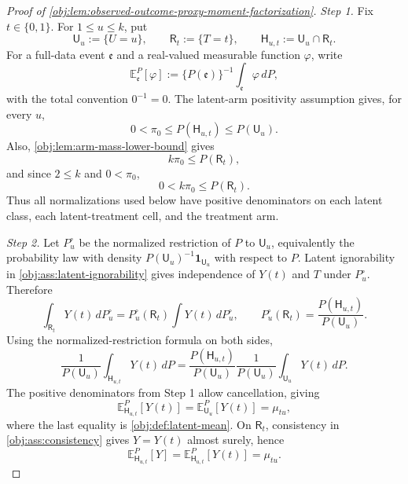 \documentclass[11pt]{article}
\begin{document}
\begin{proof}[Proof of \cref{obj:lem:observed-outcome-proxy-moment-factorization}]
\emph{Step 1.} Fix \(t\in\{0,1\}\).  For \(1\le u\le k\), put
\[
\mathsf U_u:=\{U=u\},\qquad
\mathsf R_t:=\{T=t\},\qquad
\mathsf H_{u,t}:=\mathsf U_u\cap\mathsf R_t .
\]
For a full-data event \(\mathfrak e\) and a real-valued measurable function \(\varphi\), write
\[
\mathbb E_{\mathfrak e}^{P}[\varphi]
:=
\{P(\mathfrak e)\}^{-1}\int_{\mathfrak e}\varphi\,dP,
\]
with the total convention \(0^{-1}=0\).  The latent-arm positivity assumption gives, for every \(u\),
\[
0<\pi_0\le P(\mathsf H_{u,t})\le P(\mathsf U_u).
\]
Also, \cref{obj:lem:arm-mass-lower-bound} gives
\[
k\pi_0\le P(\mathsf R_t),
\]
and since \(2\le k\) and \(0<\pi_0\),
\[
0<k\pi_0\le P(\mathsf R_t).
\]
Thus all normalizations used below have positive denominators on each latent class, each latent-treatment cell, and the treatment arm.

\emph{Step 2.} Let \(P_u^\circ\) be the normalized restriction of \(P\) to \(\mathsf U_u\), equivalently the probability law with density \(P(\mathsf U_u)^{-1}\mathbf 1_{\mathsf U_u}\) with respect to \(P\).  Latent ignorability in \cref{obj:ass:latent-ignorability} gives independence of \(Y(t)\) and \(T\) under \(P_u^\circ\).  Therefore
\[
\int_{\mathsf R_t}Y(t)\,dP_u^\circ
=
P_u^\circ(\mathsf R_t)\int Y(t)\,dP_u^\circ,
\qquad
P_u^\circ(\mathsf R_t)=\frac{P(\mathsf H_{u,t})}{P(\mathsf U_u)} .
\]
Using the normalized-restriction formula on both sides,
\[
\frac{1}{P(\mathsf U_u)}\int_{\mathsf H_{u,t}}Y(t)\,dP
=
\frac{P(\mathsf H_{u,t})}{P(\mathsf U_u)}
\frac{1}{P(\mathsf U_u)}\int_{\mathsf U_u}Y(t)\,dP .
\]
The positive denominators from Step 1 allow cancellation, giving
\[
\mathbb E_{\mathsf H_{u,t}}^{P}[Y(t)]
=
\mathbb E_{\mathsf U_u}^{P}[Y(t)]
=
\mu_{tu},
\]
where the last equality is \cref{obj:def:latent-mean}.  On \(\mathsf R_t\), consistency in \cref{obj:ass:consistency} gives \(Y=Y(t)\) almost surely, hence
\[
\mathbb E_{\mathsf H_{u,t}}^{P}[Y]
=
\mathbb E_{\mathsf H_{u,t}}^{P}[Y(t)]
=
\mu_{tu}.
\]


\end{proof}
\end{document}
